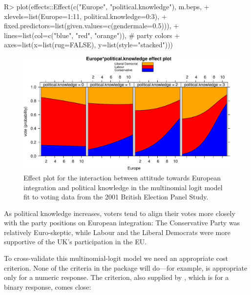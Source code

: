 \documentclass[
]{jss}
\begin{document}
\begin{CodeChunk}
\begin{CodeInput}
R> plot(effects::Effect(c("Europe", "political.knowledge"), m.beps,
+             xlevels=list(Europe=1:11, political.knowledge=0:3),
+             fixed.predictors=list(given.values=c(gendermale=0.5))),
+      lines=list(col=c("blue", "red", "orange")), # party colors
+      axes=list(x=list(rug=FALSE), y=list(style="stacked")))
\end{CodeInput}
\begin{figure}

{\centering \includegraphics{JSS-article-3_files/figure-latex/BEPS-plot-1} 

}

\caption[Effect plot for the interaction between attitude towards European integration and political knowledge in the multinomial logit model fit to voting data from the 2001 British Election Panel Study]{Effect plot for the interaction between attitude towards European integration and political knowledge in the multinomial logit model fit to voting data from the 2001 British Election Panel Study.}\label{fig:BEPS-plot}
\end{figure}
\end{CodeChunk}

As political knowledge increases, voters tend to align their votes more
closely with the party positions on European integration: The
Conservative Party was relatively Euro-skeptic, while Labour and the
Liberal Democrats were more supportive of the UK's participation in the
EU.

To cross-validate this multinomial-logit model we need an appropriate
cost criterion. None of the criteria in the  package will
do---for example,  is appropriate only for a numeric
response. The  criterion, also supplied by ,
which is for a binary response, comes close:
\end{document}

